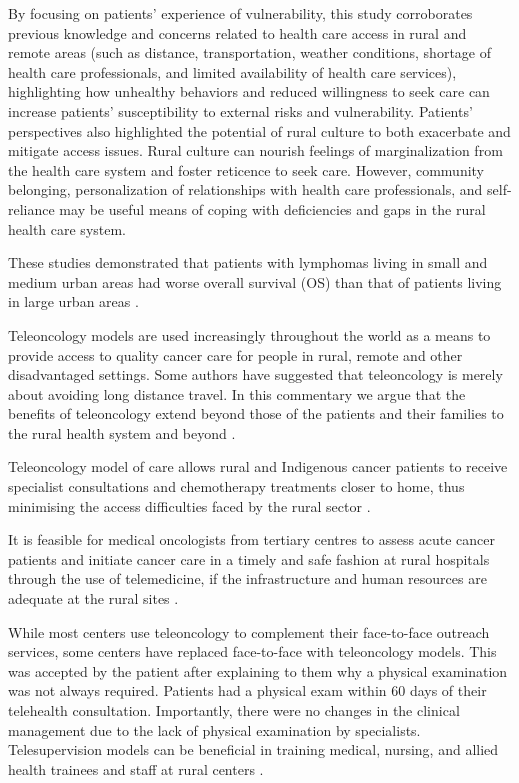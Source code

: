 By focusing on patients' experience of vulnerability, this study corroborates previous knowledge and concerns related to health care access in rural and remote areas (such as distance, transportation, weather conditions, shortage of health care professionals, and limited availability of health care services), highlighting how unhealthy behaviors and reduced willingness to seek care can increase patients' susceptibility to external risks and vulnerability. Patients' perspectives also highlighted the potential of rural culture to both exacerbate and mitigate access issues. Rural culture can nourish feelings of marginalization from the health care system and foster reticence to seek care. However, community belonging, personalization of relationships with health care professionals, and self-reliance may be useful means of coping with deficiencies and gaps in the rural health care system.
\cite{brundisini_chronic_2013}

These studies demonstrated that patients with lymphomas living in small and medium urban areas had worse overall survival (OS) than that of patients living in large urban areas \cite{lee_effect_2014}.


Teleoncology models are used increasingly throughout the world as a means to provide access to quality cancer care for people in rural, remote and other disadvantaged settings. Some authors have suggested that teleoncology is merely about avoiding long distance travel. In this commentary we argue that the benefits of teleoncology extend beyond those of the patients and their families to the rural health system and beyond \cite{sabesan_are_2014}.

Teleoncology model of care allows rural and Indigenous cancer patients to receive specialist consultations and chemotherapy treatments closer to home, thus minimising the access difficulties faced by the rural sector \cite{sabesan_telemedicine_2012}.

It is feasible for medical oncologists from tertiary centres to assess acute cancer patients and initiate cancer care in a timely and safe fashion at rural hospitals through the use of telemedicine, if the infrastructure and human resources are adequate at the rural sites \cite{sabesan_timely_2014}.

While most centers use teleoncology to complement their face-to-face outreach services, some centers have replaced face-to-face with teleoncology models. This was accepted by the patient after explaining to them why a physical examination was not always required. Patients had a physical exam within 60 days of their telehealth consultation. Importantly, there were no changes in the clinical management due to the lack of physical examination by specialists. Telesupervision models can be beneficial in training medical, nursing, and allied health trainees and staff at rural centers \cite{sabesan_medical_2014}.

